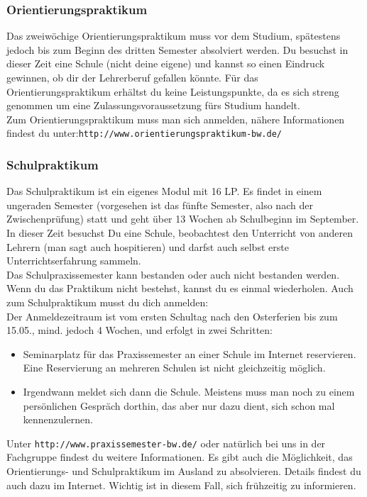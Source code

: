\subsubsection{Orientierungspraktikum}

Das zweiwöchige Orientierungspraktikum muss vor dem Studium,
spätestens jedoch bis zum Beginn
des dritten Semester absolviert werden.
Du besuchst in dieser Zeit eine Schule (nicht deine eigene)
und kannst so einen Eindruck gewinnen,
ob dir der Lehrerberuf gefallen könnte.
Für das Orientierungspraktikum erhältst du keine Leistungspunkte,
da es sich streng genommen um eine Zulassungsvoraussetzung
fürs Studium handelt. \\
Zum Orientierungspraktikum muss man sich anmelden,
nähere Informationen findest du unter:\texttt{http://www.orientierungspraktikum-bw.de/}

\subsubsection{Schulpraktikum}
Das Schulpraktikum ist ein eigenes Modul mit 16 LP.
Es findet in einem ungeraden Semester
(vorgesehen ist das fünfte Semester,
also nach der Zwischenprüfung) statt
und geht über 13 Wochen ab Schulbeginn im September.
\linebreak In dieser Zeit besuchst Du eine Schule,
beobachtest den Unterricht von anderen Lehrern
(man sagt auch \glqq hospitieren\grqq)
und darfst auch selbst erste Unterrichtserfahrung sammeln. \\
Das Schulpraxissemester kann bestanden
oder auch nicht bestanden werden.
Wenn du das Praktikum nicht bestehst,
kannst du es einmal wiederholen.
Auch zum Schulpraktikum musst du dich anmelden:\\

Der Anmeldezeitraum ist vom ersten Schultag
nach den Osterferien bis zum 15.05.,
mind. jedoch 4 Wochen, und erfolgt in
zwei Schritten:
\begin{center}
\begin{itemize}
  \item
    Seminarplatz für das Praxissemester an einer Schule im Internet reservieren. 
    Eine Reservierung an mehreren Schulen ist nicht gleichzeitig möglich.
  \item
    Irgendwann meldet sich dann die Schule. Meistens muss man noch zu einem
    persönlichen Gespräch dorthin, das aber nur dazu dient, sich schon mal
    kennenzulernen.
\end{itemize}
\end{center}
Unter \verb|http://www.praxissemester-bw.de/| oder
natürlich bei uns in der Fachgruppe findest du weitere Informationen.
Es gibt auch die Möglichkeit, das Orientierungs-
und Schulpraktikum im Ausland zu absolvieren.
Details findest du auch dazu im Internet.
Wichtig ist in diesem Fall,
sich frühzeitig zu informieren.




